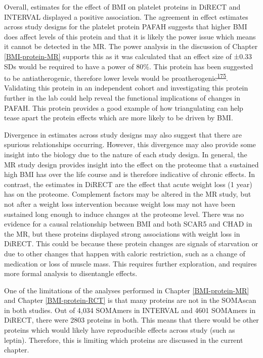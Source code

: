 \documentclass[11pt,twoside]{bristolthesis}
\begin{document}
Overall, estimates for the effect of BMI on platelet proteins in DiRECT and INTERVAL displayed a positive association. The agreement in effect estimates across study designs for the platelet protein PAFAH suggests that higher BMI does affect levels of this protein and that it is likely the power issue which means it cannot be detected in the MR. The power analysis in the discussion of Chapter \ref{BMI-protein-MR} supports this as it was calculated that an effect size of ±0.33 SDs would be required to have a power of 80\%. This protein has been suggested to be antiatherogenic, therefore lower levels would be proatherogenic\textsuperscript{\protect\hyperlink{ref-Noto2003}{175}}. Validating this protein in an independent cohort and investigating this protein further in the lab could help reveal the functional implications of changes in PAFAH. This protein provides a good example of how triangulating can help tease apart the protein effects which are more likely to be driven by BMI.

Divergence in estimates across study designs may also suggest that there are spurious relationships occurring. However, this divergence may also provide some insight into the biology due to the nature of each study design. In general, the MR study design provides insight into the effect on the proteome that a sustained high BMI has over the life course and is therefore indicative of chronic effects. In contrast, the estimates in DiRECT are the effect that acute weight loss (1 year) has on the proteome. Complement factors may be altered in the MR study, but not after a weight loss intervention because weight loss may not have been sustained long enough to induce changes at the proteome level. There was no evidence for a causal relationship between BMI and both SCAR5 and CHAD in the MR, but these proteins displayed strong associations with weight loss in DiRECT. This could be because these protein changes are signals of starvation or due to other changes that happen with caloric restriction, such as a change of medication or loss of muscle mass. This requires further exploration, and requires more formal analysis to disentangle effects.

One of the limitations of the analyses performed in Chapter \ref{BMI-protein-MR} and Chapter \ref{BMI-protein-RCT} is that many proteins are not in the SOMAscan in both studies. Out of 4,034 SOMAmers in INTERVAL and 4601 SOMAmers in DiRECT, there were 2803 proteins in both. This means that there would be other proteins which would likely have reproducible effects across study (such as leptin). Therefore, this is limiting which proteins are discussed in the current chapter.
\end{document}
